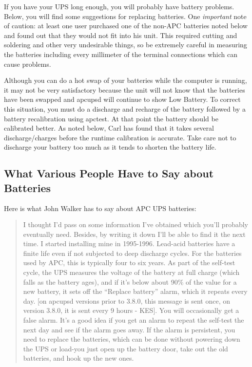{{{{{{\label{index-Maintenance-144}
If you have your UPS long enough, you will probably have battery problems.
Below, you will find some suggestions for replacing batteries. One {\it
important} note of caution: at least one user purchased one of the non-APC
batteries noted below and found out that they would not fit into his unit.
This required cutting and soldering and other very undesirable things, so be
extremely careful in measuring the batteries including every millimeter of the
terminal connections which can cause problems.  

Although you can do a hot swap of your batteries while the computer is
running, it may not be very satisfactory because the unit will not know that
the batteries have been swapped and apcupsd will continue to show Low Battery.
To correct this situation, you must do a discharge and recharge of the
battery followed by a battery recalibration using apctest.  At that point the
battery should be calibrated better.  As noted below, Carl has found that it
takes several discharge/charges before the runtime calibration is accurate. 
Take care not to discharge your battery too much as it tends to shorten the
battery life. 

\label{What-Various-People-Have-to-Say-about-Batteries}

\subsection*{What Various People Have to Say about Batteries}

\label{index-Batteries-145}
Here is what John Walker has to say about APC UPS batteries:  

\begin{quote}

I thought I'd pass on some information I've obtained which you'll probably
eventually need. Besides, by writing it down I'll be able to find it the next
time. I started installing mine in 1995-1996. Lead-acid batteries have a
finite life even if not subjected to deep discharge cycles. For the batteries
used by APC, this is typically four to six years. As part of the self-test
cycle, the UPS measures the voltage of the battery at full charge (which falls
as the battery ages), and if it's below about 90\% of the value for a new
battery, it sets off the ``Replace battery'' alarm, which it repeats every
day. [on apcupsd versions prior to 3.8.0, this message is sent once, on
version 3.8.0, it is sent every 9 hours - KES]. You will occasionally get a
false alarm. It's a good idea if you get an alarm to repeat the self-test the
next day and see if the alarm goes away. If the alarm is persistent, you need
to replace the batteries, which can be done without powering down the UPS or
load-you just open up the battery door, take out the old batteries, and hook
up the new ones.  


\end{quote}}}}}}}
